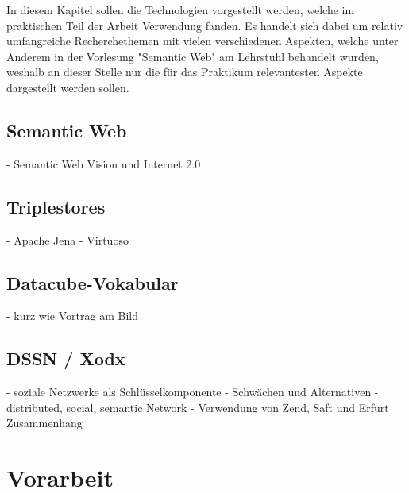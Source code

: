 \documentclass{article}
\begin{document}
In diesem Kapitel sollen die Technologien vorgestellt werden, welche im praktischen Teil der Arbeit Verwendung fanden. Es handelt sich dabei um relativ umfangreiche Recherchethemen mit vielen verschiedenen Aspekten, welche unter Anderem in der Vorlesung "Semantic Web" am Lehrstuhl behandelt wurden, weshalb an dieser Stelle nur die für das Praktikum relevantesten Aspekte dargestellt werden sollen.


\subsection{Semantic Web}

- Semantic Web Vision und Internet 2.0


\subsection{Triplestores}

- Apache Jena
- Virtuoso

\subsection{Datacube-Vokabular}

- kurz wie Vortrag am Bild

\subsection{DSSN / Xodx}

- soziale Netzwerke als Schlüsselkomponente
- Schwächen und Alternativen
- distributed, social, semantic Network
- Verwendung von Zend, Saft und Erfurt Zusammenhang

\section{Vorarbeit}
\end{document}
